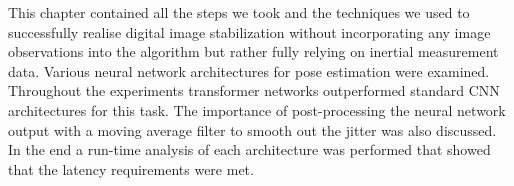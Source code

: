 This chapter contained all the steps we took and the techniques we used to successfully realise digital image stabilization without incorporating any image observations into the algorithm but rather fully relying on inertial measurement data. Various neural network architectures for pose estimation were examined. Throughout the experiments transformer networks outperformed standard CNN architectures for this task. The importance of post-processing the neural network output with a moving average filter to smooth out the jitter was also discussed. In the end a run-time analysis of each architecture was performed that showed that the latency  requirements were met.


